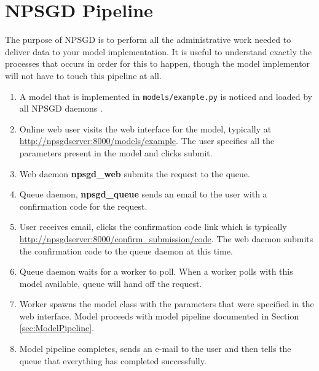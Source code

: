 \documentclass{article}
\newcommand{\mpath}[1]{\texttt{#1}}
\begin{document}
\section{NPSGD Pipeline}
The purpose of NPSGD is to perform all the administrative work needed to deliver
data to your model implementation. It is useful to understand exactly the
processes that occurs in order for this to happen, though the model implementor
will not have to touch this pipeline at all.
\begin{enumerate}
   \item A model that is implemented in \mpath{models/example.py} is noticed and
   loaded by all NPSGD daemons .
   \item Online web user visits the web interface for the model, typically at
   \url{http://npsgdserver:8000/models/example}. The user specifies all the parameters
   present in the model and clicks submit.
   \item Web daemon \textbf{npsgd\_web} submits the request to the queue.
   \item Queue daemon, \textbf{npsgd\_queue} sends an email to the user with a
   confirmation code for the request.
   \item User receives email, clicks the confirmation code link which is
   typically \url{http://npsgdserver:8000/confirm_submission/code}. The web
   daemon submits the confirmation code to the queue daemon at this time.
   \item Queue daemon waits for a worker to poll. When a worker polls with this
   model available, queue will hand off the request. 
   \item Worker spawns the model class with the parameters that were specified
   in the web interface. Model proceeds with model pipeline documented in
   Section \ref{sec:ModelPipeline}.
   \item Model pipeline completes, sends an e-mail to the user and then tells
   the queue that everything has completed successfully.
\end{enumerate}
\end{document}
